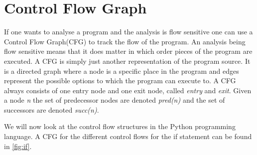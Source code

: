\section{Control Flow Graph}
If one wants to analyse a program and the analysis is flow sensitive one can use a Control Flow Graph(CFG) to track the flow of the program.
An analysis being flow sensitive means that it does matter in which order pieces of the program are executed.
A CFG is simply just another representation of the program source.
It is a directed graph where a node is a specific place in the program and edges represent the possible options to which the program can execute to.
A CFG always consists of one entry node and one exit node, called \textit{entry} and \textit{exit}.
Given a node \textit{n} the set of predecessor nodes are denoted \textit{pred(n)} and the set of successors are denoted \textit{succ(n)}.

We will now look at the control flow structures in the Python programming language.
A CFG for the different control flows for the if statement can be found in \cref{fig:if}.

